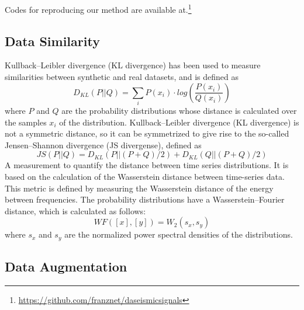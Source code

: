 \documentclass[lettersize,journal]{IEEEtran}
\begin{document}
Codes for reproducing our method are available at.\footnote{\href{https://github.com/franznet/daseismicsignals}{https://github.com/franznet/daseismicsignals}}



\subsection{Data Similarity}
\noindent Kullback–Leibler divergence (KL divergence) has been used to measure similarities between synthetic and real datasets, and is defined as
\begin{equation}
D_{KL}(P||Q)=\sum_{i}P(x_i )\cdot log\left(\frac{P(x_i)}{Q(x_i)}\right)
\end{equation}
where $P$ and $Q$ are the probability distributions whose distance is calculated over the samples $x_i$  of the distribution\cite{iglesias2023data}. Kullback–Leibler divergence (KL divergence) is not a symmetric distance, so it can be symmetrized to give rise to the so-called Jensen–Shannon divergence (JS divergense), defined as
\begin{equation}
JS(P||Q)=D_{KL} (P||(P+Q)/2) +D_{KL}(Q||(P+Q)/2)
\end{equation}
A measurement to quantify the distance between time series distributions. It is based on the calculation of the Wasserstein distance between time-series data. This metric is defined by measuring the Wasserstein distance of the energy between frequencies. The probability distributions have a Wasserstein–Fourier distance, which is calculated as follows\cite{iglesias2023data}:
\begin{equation}
WF([x],[y])=W_2 (s_x,s_y)
\end{equation}
where $s_x$ and $s_y$ are the normalized power spectral densities of the distributions.


\subsection{Data Augmentation}
\end{document}
